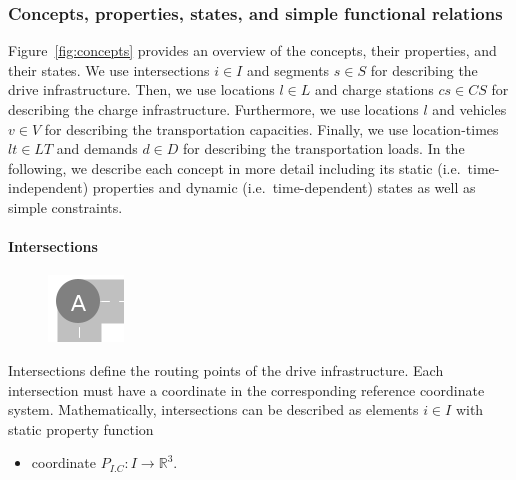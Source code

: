 \documentclass[graybox]{svmult}
\begin{document}
\subsubsection{Concepts, properties, states, and simple functional relations}
\label{sec:simple}
Figure~\ref{fig:concepts} provides an overview of the concepts, their properties, and their states.
We use intersections $i \in I$ and segments $s \in S$ for describing the drive infrastructure.
Then, we use locations $l \in L$ and charge stations $cs \in CS$ for describing the charge infrastructure.
Furthermore, we use locations $l$ and vehicles $v \in V$ for describing the transportation capacities.
Finally, we use location-times $lt \in LT$ and demands $d \in D$ for describing the transportation loads.
In the following, we describe each concept in more detail including its static (i.e.\ time-independent) properties and dynamic (i.e.\ time-dependent) states as well as simple constraints.



\paragraph{Intersections}
\begin{figure}
	\centering
		\includegraphics[scale=0.5]{../../concepts/intersection.png}
\end{figure}
Intersections define the routing points of the drive infrastructure.
Each intersection must have a coordinate in the corresponding reference coordinate system.
Mathematically, intersections can be described as elements $i \in I$ with static property function
\begin{itemize}
	\item coordinate $P_{I.C}: I \rightarrow \mathbb{R}^3$.
\end{itemize}

\end{document}
